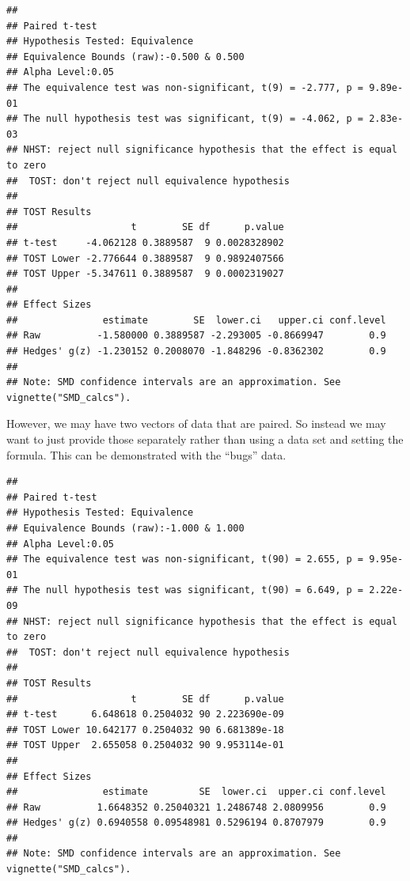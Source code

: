 \documentclass[]{interact}
\theoremstyle{plain}%
\theoremstyle{definition}
\theoremstyle{remark}
\newenvironment{Shaded}{\begin{snugshade}}{\end{snugshade}}
\newcommand{\AttributeTok}[1]{\textcolor[rgb]{0.77,0.63,0.00}{#1}}
\newcommand{\ConstantTok}[1]{\textcolor[rgb]{0.00,0.00,0.00}{#1}}
\newcommand{\DecValTok}[1]{\textcolor[rgb]{0.00,0.00,0.81}{#1}}
\newcommand{\FunctionTok}[1]{\textcolor[rgb]{0.00,0.00,0.00}{#1}}
\newcommand{\NormalTok}[1]{#1}
\newcommand{\OtherTok}[1]{\textcolor[rgb]{0.56,0.35,0.01}{#1}}
\newcommand{\SpecialCharTok}[1]{\textcolor[rgb]{0.00,0.00,0.00}{#1}}
\begin{document}
\begin{verbatim}
## 
## Paired t-test
## Hypothesis Tested: Equivalence
## Equivalence Bounds (raw):-0.500 & 0.500
## Alpha Level:0.05
## The equivalence test was non-significant, t(9) = -2.777, p = 9.89e-01
## The null hypothesis test was significant, t(9) = -4.062, p = 2.83e-03
## NHST: reject null significance hypothesis that the effect is equal to zero 
##  TOST: don't reject null equivalence hypothesis
## 
## TOST Results 
##                    t        SE df      p.value
## t-test     -4.062128 0.3889587  9 0.0028328902
## TOST Lower -2.776644 0.3889587  9 0.9892407566
## TOST Upper -5.347611 0.3889587  9 0.0002319027
## 
## Effect Sizes 
##               estimate        SE  lower.ci   upper.ci conf.level
## Raw          -1.580000 0.3889587 -2.293005 -0.8669947        0.9
## Hedges' g(z) -1.230152 0.2008070 -1.848296 -0.8362302        0.9
## 
## Note: SMD confidence intervals are an approximation. See vignette("SMD_calcs").
\end{verbatim}

However, we may have two vectors of data that are paired. So instead we
may want to just provide those separately rather than using a data set
and setting the formula. This can be demonstrated with the ``bugs''
data.

\begin{Shaded}
\end{Shaded}

\begin{verbatim}
## 
## Paired t-test
## Hypothesis Tested: Equivalence
## Equivalence Bounds (raw):-1.000 & 1.000
## Alpha Level:0.05
## The equivalence test was non-significant, t(90) = 2.655, p = 9.95e-01
## The null hypothesis test was significant, t(90) = 6.649, p = 2.22e-09
## NHST: reject null significance hypothesis that the effect is equal to zero 
##  TOST: don't reject null equivalence hypothesis
## 
## TOST Results 
##                    t        SE df      p.value
## t-test      6.648618 0.2504032 90 2.223690e-09
## TOST Lower 10.642177 0.2504032 90 6.681389e-18
## TOST Upper  2.655058 0.2504032 90 9.953114e-01
## 
## Effect Sizes 
##               estimate         SE  lower.ci  upper.ci conf.level
## Raw          1.6648352 0.25040321 1.2486748 2.0809956        0.9
## Hedges' g(z) 0.6940558 0.09548981 0.5296194 0.8707979        0.9
## 
## Note: SMD confidence intervals are an approximation. See vignette("SMD_calcs").
\end{verbatim}
\end{document}
